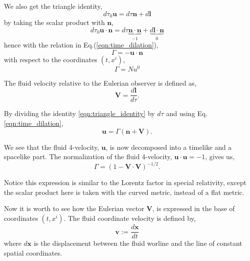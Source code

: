 We also get the triangle identity,
\begin{equation}
    d\tau_0 \mathbf{u} = d\tau \mathbf{n} + d\mathbf{l}
    \label{eqn:triangle_identity}
\end{equation}
by taking the scalar product with $\mathbf{n}$,
\begin{equation}
    d\tau_0 \mathbf{u} \cdot \mathbf{n} = d\tau \underbrace{\mathbf{n} \cdot \mathbf{n}}_{-1} + \underbrace{d\mathbf{l} \cdot \mathbf{n}}_{0}
\end{equation}
hence with the relation in Eq.(\ref{eqn:time_dilation}),
\begin{equation}
    \Gamma=-\mathbf{u} \cdot \mathbf{n}
\end{equation}
with respect to the coordinates $(t,x^i)$,
\begin{equation}
    \Gamma = Nu^0
\end{equation}

The fluid velocity relative to the Eulerian observer is defined as,
\begin{equation}
    \mathbf{V}=\frac{d\mathbf{l}}{d\tau}.
    \label{eqn:definition_eulerian_fluid_velocity}
\end{equation}

By dividing the identity \ref{eqn:triangle_identity} by $d\tau$ and using Eq.\ref{eqn:time_dilation},
\begin{equation}
    \mathbf{u}=\Gamma(\mathbf{n}+\mathbf{V}).
    \label{eqn:general_fluid_expression}
\end{equation}

We see that the fluid 4-velocity, $\mathbf{u}$, is now decomposed into a timelike and a spacelike part. The normalization of the fluid 4-velocity, $\mathbf{u}\cdot \mathbf{u}=-1$, gives us,
\begin{equation}
    \Gamma=(1-\mathbf{V}\cdot \mathbf{V})^{-1/2}.
    \label{eqn:general_gamma}
\end{equation} 

Notice this expression is similar to the Lorentz factor in special relativity, except the scalar product here is taken with the curved metric, instead of a flat metric.

Now it is worth to see how the Eulerian vector $\mathbf{V}$, is expressed in the base of coordinates $(t,x^i)$. 
The fluid coordinate velocity is defined by,
\begin{equation}
    \mathbf{v}:= \frac{d\mathbf{x}}{dt}
    \label{fig:definition_fluid_coordinate_velocity}
\end{equation}
where $d\mathbf{x}$ is the displacement between the fluid worline and the line of constant spatial coordinates.

